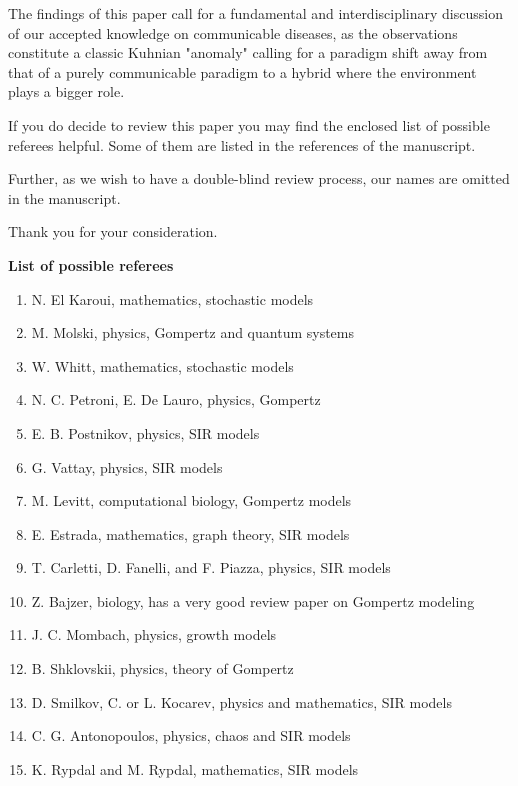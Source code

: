 \documentclass[11pt,a4paper,roman]{moderncv}
\begin{document}
The findings of this paper call for a fundamental and interdisciplinary discussion of our accepted knowledge on communicable diseases, as the observations constitute a classic Kuhnian "anomaly" calling for a paradigm shift away from that of a purely communicable paradigm to a hybrid where the environment plays a bigger role.

If you do decide to review this paper you may find the enclosed list of possible referees helpful. 
Some of them are listed in the references of the manuscript. 

Further, as we wish to have a double-blind review process, our names are omitted in the manuscript.

Thank you for your consideration.

\makeletterclosing
\newpage
\textbf{List of possible referees}
\begin{enumerate}
\item N. El Karoui, mathematics, stochastic models
\item M. Molski, physics, Gompertz and quantum systems
\item W. Whitt, mathematics, stochastic models
\item N. C. Petroni, E. De Lauro, physics, Gompertz
\item E. B. Postnikov, physics, SIR models
\item G. Vattay, physics, SIR models
\item M. Levitt, computational biology, Gompertz models
\item E. Estrada, mathematics, graph theory, SIR models
\item T. Carletti, D. Fanelli, and F. Piazza, physics, SIR models
\item Z. Bajzer, biology, has a very good review paper on Gompertz modeling 
\item J. C. Mombach, physics, growth models
\item B. Shklovskii, physics, theory of Gompertz
\item D. Smilkov, C. or L. Kocarev, physics and mathematics, SIR models
\item C. G. Antonopoulos, physics, chaos and SIR models
\item K. Rypdal and M. Rypdal, mathematics, SIR models

\end{enumerate} 
\end{document}
